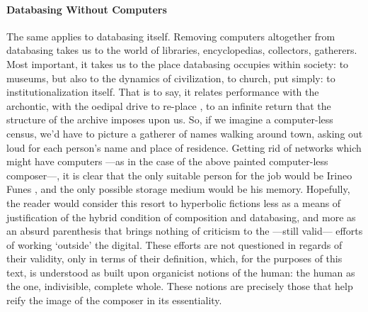 \paragraph{Databasing Without Computers}
The same applies to databasing itself. Removing computers altogether from databasing takes us to the world of libraries, encyclopedias, collectors, gatherers. Most important, it takes us to the place databasing occupies within society: to museums, but also to the dynamics of civilization, to church, put simply: to institutionalization itself. That is to say, it relates performance with the archontic, with the oedipal drive to re-place , to an infinite return that the structure of the archive imposes upon us. So, if we imagine a computer-less census, we'd have to picture a gatherer of names walking around town, asking out loud for each person's name and place of residence. Getting rid of networks which might have computers ---as in the case of the above painted computer-less composer---, it is clear that the only suitable person for the job would be Irineo Funes , and the only possible storage medium would be his memory. Hopefully, the reader would consider this resort to hyperbolic fictions less as a means of justification of the hybrid condition of composition and databasing, and more as an absurd parenthesis that brings nothing of criticism to the ---still valid--- efforts of working `outside' the digital. These efforts are not questioned in regards of their validity, only in terms of their definition, which, for the purposes of this text, is understood as built upon organicist notions of the human: the human as the one, indivisible, complete whole. These notions are precisely those that help reify the image of the composer in its essentiality.